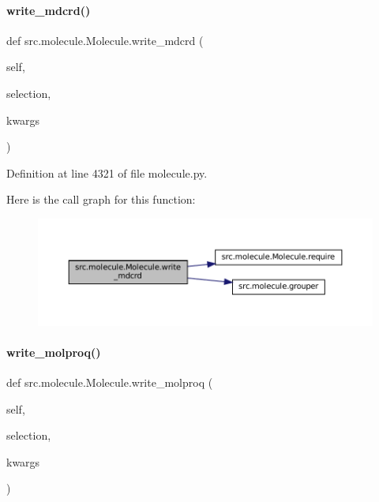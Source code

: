 \paragraph{\texorpdfstring{write\+\_\+mdcrd()}{write\_mdcrd()}}
{\footnotesize\ttfamily def src.\+molecule.\+Molecule.\+write\+\_\+mdcrd (\begin{DoxyParamCaption}\item[{}]{self,  }\item[{}]{selection,  }\item[{}]{kwargs }\end{DoxyParamCaption})}



Definition at line 4321 of file molecule.\+py.

Here is the call graph for this function\+:
\nopagebreak
\begin{figure}[H]
\begin{center}
\leavevmode
\includegraphics[width=350pt]{classsrc_1_1molecule_1_1Molecule_a94a0b29f772bb5e6e03383fd854ad70a_cgraph}
\end{center}
\end{figure}
\mbox{\label{classsrc_1_1molecule_1_1Molecule_ab74230360451f0feefcfceae3b292223}} 
\paragraph{\texorpdfstring{write\+\_\+molproq()}{write\_molproq()}}
{\footnotesize\ttfamily def src.\+molecule.\+Molecule.\+write\+\_\+molproq (\begin{DoxyParamCaption}\item[{}]{self,  }\item[{}]{selection,  }\item[{}]{kwargs }\end{DoxyParamCaption})}



